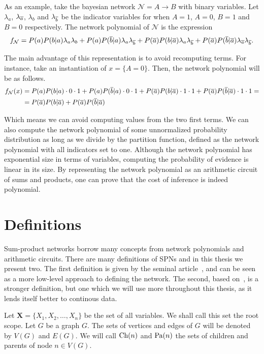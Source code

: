 As an example, take the bayesian network $\mathcal{N}=A\to B$ with binary variables. Let
$\lambda_a$, $\lambda_{\overline{a}}$, $\lambda_b$ and $\lambda_{\overline{b}}$ be the indicator variables for
when $A=1$, $A=0$, $B=1$ and $B=0$ respectively. The network polynomial of $\mathcal{N}$ is the
expression
\begin{equation*}
  f_{\mathcal{N}}=P(a)P(b|a)\lambda_a\lambda_b+P(a)P(\overline{b}|a)\lambda_a\lambda_{\overline{b}}+
  P(\overline{a})P(b|\overline{a})\lambda_a\lambda_{\overline{b}}+P(\overline{a})P(\overline{b}|\overline{a})\lambda_{\overline{a}}
  \lambda_{\overline{b}}.
\end{equation*}

The main advantage of this representation is to avoid recomputing terms. For instance, take an
instantiation of $x=\{A=0\}$. Then, the network polynomial will be as follows.
\begin{align*}
  f_{\mathcal{N}}(x)&=P(a)P(b|a)\cdot 0\cdot 1+P(a)P(\overline{b}|a)\cdot 0\cdot
  1+P(\overline{a})P(b|\overline{a})\cdot 1\cdot 1+P(\overline{a})P(\overline{b}|\overline{a})\cdot 1\cdot 1=\\
  &=P(\overline{a})P(b|\overline{a})+P(\overline{a})P(\overline{b}|\overline{a})
\end{align*}

Which means we can avoid computing values from the two first terms. We can also compute the network
polynomial of some unnormalized probability distribution as long as we divide by the partition
function, defined as the network polynomial with all indicators set to one. Although the network
polynomial has exponential size in terms of variables, computing the probability of evidence is
linear in its size. By representing the network polynomial as an arithmetic circuit of sums and
products, one can prove that the cost of inference is indeed polynomial.

\section{Definitions}

Sum-product networks borrow many concepts from network polynomials and arithmetic circuits. There
are many definitions of SPNs and in this thesis we present two. The first definition is given by
the seminal article~\cite{poon-domingos}, and can be seen as a more low-level approach to defining
the network\@. The second, based on~\cite{gens-domingos}, is a stronger definition, but one which
we will use more throughout this thesis, as it lends itself better to continous data.

Let $\mathbf{X}=\{X_1,X_2,\ldots,X_n\}$ be the set of all variables. We shall call this set the
root scope. Let $G$ be a graph $G$. The sets of vertices and edges of $G$ will be denoted by $V(G)$
and $E(G)$. We will call $\operatorname*{\text{Ch}}(n)$ and $\operatorname*{\text{Pa}}(n)$ the sets of children and parents of node $n\in
V(G)$.

